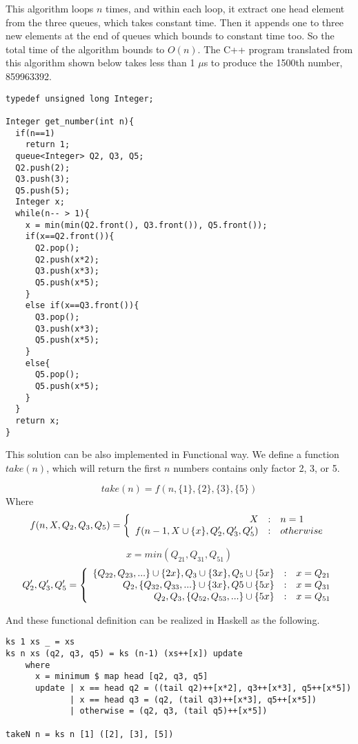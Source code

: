 \documentclass{article}
\begin{document}
This algorithm loops $n$ times, and within each loop, it extract one head
element from the three queues, which takes constant time. Then it appends
one to three new elements at the end of queues which bounds to constant time
too. So the total time of the algorithm bounds to $O(n)$. The C++ program
translated from this algorithm shown below takes less than 1 $\mu$s to
produce the 1500th number, 859963392.

\lstset{language=C++}
\begin{lstlisting}
typedef unsigned long Integer;

Integer get_number(int n){
  if(n==1)
    return 1;
  queue<Integer> Q2, Q3, Q5;
  Q2.push(2);
  Q3.push(3);
  Q5.push(5);
  Integer x;
  while(n-- > 1){
    x = min(min(Q2.front(), Q3.front()), Q5.front());
    if(x==Q2.front()){
      Q2.pop();
      Q2.push(x*2);
      Q3.push(x*3);
      Q5.push(x*5);
    }
    else if(x==Q3.front()){
      Q3.pop();
      Q3.push(x*3);
      Q5.push(x*5);
    }
    else{
      Q5.pop();
      Q5.push(x*5);
    }
  }
  return x;
}
\end{lstlisting}

This solution can be also implemented in Functional way. We define
a function $take(n)$, which will return the first $n$ numbers contains
only factor 2, 3, or 5.

\[
  take(n) = f(n, \{1\}, \{2\}, \{3\}, \{5\})
\]
Where
\[
 f(n, X, Q_2, Q_3, Q_5) = \left \{
  \begin{array}{r@{\quad:\quad}l}
  X & n = 1 \\
  f(n-1, X \cup \{x\}, Q_2', Q_3', Q_5') & otherwise
  \end{array}
\right.
\]

\[
 x = min(Q_{21}, Q_{31}, Q_{51})
\]
\[
 Q_2', Q_3', Q_5' = \left \{
 \begin{array}{r@{\quad:\quad}l}
 \{Q_{22}, Q_{23}, ...\} \cup \{2x\}, Q_3 \cup \{3x\}, Q_5 \cup \{5x\} & x = Q_{21} \\
 Q_2, \{Q_{32}, Q_{33}, ...\} \cup \{3x\}, Q5 \cup \{5x\} & x = Q_{31} \\
 Q_2, Q_3, \{Q_{52}, Q_{53}, ...\} \cup \{5x\} & x = Q_{51}
 \end{array}
 \right.
\]

And these functional definition can be realized in Haskell as the following.

\lstset{language=Haskell}
\begin{lstlisting}
ks 1 xs _ = xs
ks n xs (q2, q3, q5) = ks (n-1) (xs++[x]) update
    where
      x = minimum $ map head [q2, q3, q5]
      update | x == head q2 = ((tail q2)++[x*2], q3++[x*3], q5++[x*5])
             | x == head q3 = (q2, (tail q3)++[x*3], q5++[x*5])
             | otherwise = (q2, q3, (tail q5)++[x*5])

takeN n = ks n [1] ([2], [3], [5])
\end{lstlisting} %
\end{document}
